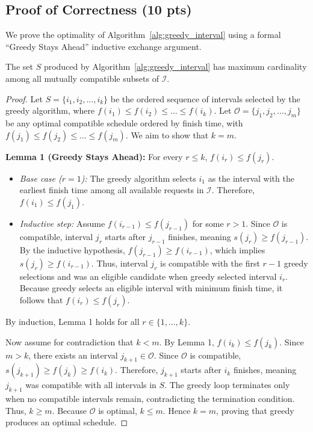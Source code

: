 \subsection{Proof of Correctness (10 pts)}
We prove the optimality of Algorithm~\ref{alg:greedy_interval} using a formal ``Greedy Stays Ahead'' inductive exchange argument.

\begin{theorem}
The set $S$ produced by Algorithm~\ref{alg:greedy_interval} has maximum cardinality among all mutually compatible subsets of $\mathcal{I}$.
\end{theorem}

\begin{proof}
Let $S = \{i_1, i_2, \dots, i_k\}$ be the ordered sequence of intervals selected by the greedy algorithm, where $f(i_1) \le f(i_2) \le \dots \le f(i_k)$.
Let $\mathcal{O} = \{j_1, j_2, \dots, j_m\}$ be any optimal compatible schedule ordered by finish time, with $f(j_1) \le f(j_2) \le \dots \le f(j_m)$. We aim to show that $k = m$.

\textbf{Lemma 1 (Greedy Stays Ahead):} For every $r \le k$, $f(i_r) \le f(j_r)$.
\begin{itemize}
    \item \textit{Base case ($r=1$):} The greedy algorithm selects $i_1$ as the interval with the earliest finish time among all available requests in $\mathcal{I}$. Therefore, $f(i_1) \le f(j_1)$.
    \item \textit{Inductive step:} Assume $f(i_{r-1}) \le f(j_{r-1})$ for some $r > 1$. Since $\mathcal{O}$ is compatible, interval $j_r$ starts after $j_{r-1}$ finishes, meaning $s(j_r) \ge f(j_{r-1})$. By the inductive hypothesis, $f(j_{r-1}) \ge f(i_{r-1})$, which implies $s(j_r) \ge f(i_{r-1})$. Thus, interval $j_r$ is compatible with the first $r-1$ greedy selections and was an eligible candidate when greedy selected interval $i_r$. Because greedy selects an eligible interval with minimum finish time, it follows that $f(i_r) \le f(j_r)$.
\end{itemize}
By induction, Lemma 1 holds for all $r \in \{1, \dots, k\}$.

Now assume for contradiction that $k < m$. By Lemma 1, $f(i_k) \le f(j_k)$. Since $m > k$, there exists an interval $j_{k+1} \in \mathcal{O}$. Since $\mathcal{O}$ is compatible, $s(j_{k+1}) \ge f(j_k) \ge f(i_k)$. Therefore, $j_{k+1}$ starts after $i_k$ finishes, meaning $j_{k+1}$ was compatible with all intervals in $S$. The greedy loop terminates only when no compatible intervals remain, contradicting the termination condition. Thus, $k \ge m$. Because $\mathcal{O}$ is optimal, $k \le m$. Hence $k = m$, proving that greedy produces an optimal schedule.
\end{proof}


